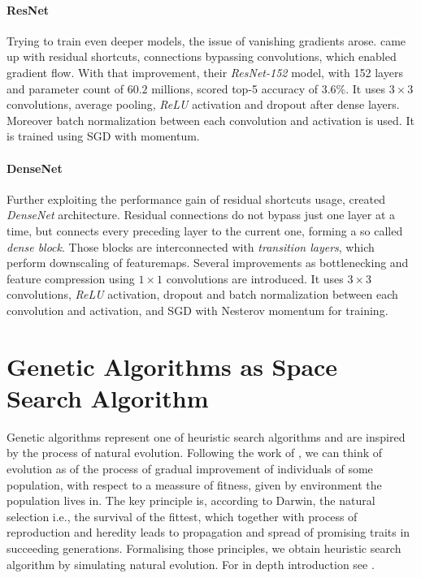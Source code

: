 \paragraph{ResNet}
Trying to train even deeper models, the issue of vanishing gradients arose. \cite{DBLP:journals/corr/HeZRS15} came up with residual shortcuts, connections bypassing convolutions, which enabled gradient flow. With that improvement, their \emph{ResNet-152} model, with 152 layers and parameter count of $60.2$ millions, scored top-5 accuracy of $3.6\%$. It uses $3 \times 3$ convolutions, average pooling, \emph{ReLU} activation and dropout after dense layers. Moreover batch normalization between each convolution and activation is used. It is trained using SGD with momentum.

\paragraph{DenseNet}
\label{sec:densenet}
Further exploiting the performance gain of residual shortcuts usage, \cite{DBLP:journals/corr/HuangLW16a} created \emph{DenseNet} architecture. Residual connections do not bypass just one layer at a time, but connects every preceding layer to the current one, forming a so called \emph{dense block}. Those blocks are interconnected with \emph{transition layers}, which perform downscaling of featuremaps. Several improvements as bottlenecking and feature compression using $1 \times 1$ convolutions are introduced. It uses $3 \times 3$ convolutions, \emph{ReLU} activation, dropout and batch normalization between each convolution and activation, and SGD with Nesterov momentum for training.

\section{Genetic Algorithms as Space Search Algorithm}
\label{sec:ga_theory}
Genetic algorithms represent one of heuristic search algorithms and are inspired by the process of natural evolution. Following the work of \cite{darwin1859}, we can think of evolution as of the process of gradual improvement of individuals of some population, with respect to a meassure of fitness, given by environment the population lives in. The key principle is, according to Darwin, the natural selection i.e., the survival of the fittest, which together with process of reproduction and heredity leads to propagation and spread of promising traits in succeeding generations. Formalising those principles, we obtain heuristic search algorithm by simulating natural evolution. For in depth introduction see \cite{evolution}.

